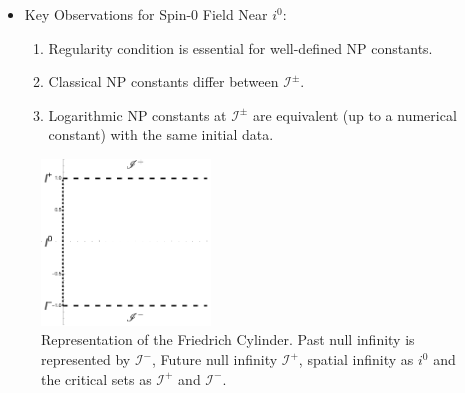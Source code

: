 \documentclass{beamer}
\theoremstyle{remark}
\theoremstyle{plain}
\theoremstyle{plain}
\begin{document}
\begin{frame}
  \begin{itemize}
    \item Key Observations for Spin-0 Field Near $i^0$:
    \begin{enumerate}
      \item Regularity condition is essential for well-defined NP constants.
      \item Classical NP constants differ between $\mathscr{I}^{\pm}$.
      \item Logarithmic NP constants at $\mathscr{I}^{\pm}$ are equivalent (up to a numerical constant) with the same initial data.
    \end{enumerate}
  \end{itemize}
  \begin{figure}[h]
    \centering \includegraphics[width =0.4\textwidth]{friedrich cylinder.pdf}
      \caption{Representation of the Friedrich Cylinder. Past null infinity is represented by
      $\mathscr{I}^{-}$, Future null infinity $\mathscr{I}^{+}$, spatial infinity as $i^{0}$ and the critical sets as $\mathcal{I}^{+}$ and $\mathcal{I}^{-}$.}
  \end{figure}
\end{frame}
\end{document}
